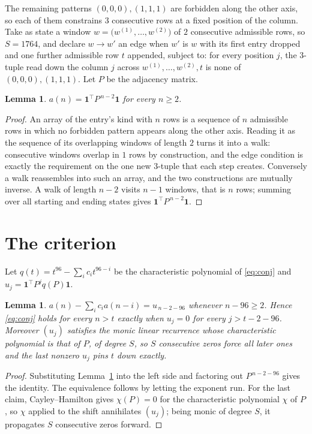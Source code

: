 \documentclass[11pt,a4paper]{article}
\theoremstyle{plain}
\newtheorem{lemma}[theorem]{Lemma}
\theoremstyle{definition}
\begin{document}
The remaining patterns $(0,0,0), (1,1,1)$ are forbidden along the other axis, so each of them
constrains $3$ consecutive rows at a fixed position of the column. Take as state a
window $w=\bigl(w^{(1)},\dots,w^{(2)}\bigr)$ of $2$ consecutive admissible
rows, so $S=1764$, and declare $w\to w'$ an edge when $w'$ is $w$ with its first entry
dropped and one further admissible row $t$ appended, subject to: for every position
$j$, the $3$-tuple read down the column $j$ across $w^{(1)},\dots,w^{(2)},t$
is none of $(0,0,0), (1,1,1)$. Let $P$ be the adjacency matrix.

\begin{lemma}\label{lem:walk}
$a(n)=\mathbf{1}^{\!\top}P^{\,n-2}\mathbf{1}$ for every $n\ge2$.
\end{lemma}

\begin{proof}
An array of the entry's kind with $n$ rows is a sequence of $n$ admissible rows in
which no forbidden pattern appears along the other axis. Reading it as the sequence of its
overlapping windows of length $2$ turns it into a walk: consecutive windows overlap in
$1$ rows by construction, and the edge condition is exactly the requirement on the one
new $3$-tuple that each step creates. Conversely a walk reassembles into such an array,
and the two constructions are mutually inverse. A walk of length $n-2$ visits $n-1$
windows, that is $n$ rows; summing over all starting and ending states gives
$\mathbf{1}^{\!\top}P^{\,n-2}\mathbf{1}$.
\end{proof}

\section{The criterion}

Let $q(t)=t^{96}-\sum_i c_i t^{96-i}$ be the characteristic polynomial of
\eqref{eq:conj} and $u_j=\mathbf{1}^{\!\top}P^{j}q(P)\mathbf{1}$.

\begin{lemma}\label{lem:crit}
$a(n)-\sum_i c_i a(n-i)=u_{\,n-2-96}$ whenever $n-96\ge2$. Hence
\eqref{eq:conj} holds for every $n>t$ exactly when $u_j=0$ for every
$j>t-2-96$. Moreover $(u_j)$ satisfies the monic linear recurrence whose
characteristic polynomial is that of $P$, of degree $S$, so $S$ consecutive zeros force all
later ones and the last nonzero $u_j$ pins $t$ down exactly.
\end{lemma}

\begin{proof}
Substituting Lemma~\ref{lem:walk} into the left side and factoring out
$P^{\,n-2-96}$ gives the identity. The equivalence follows by letting the exponent
run. For the last claim, Cayley--Hamilton gives $\chi(P)=0$ for the characteristic
polynomial $\chi$ of $P$, so $\chi$ applied to the shift annihilates $(u_j)$; being monic of
degree $S$, it propagates $S$ consecutive zeros forward.
\end{proof}
\end{document}
